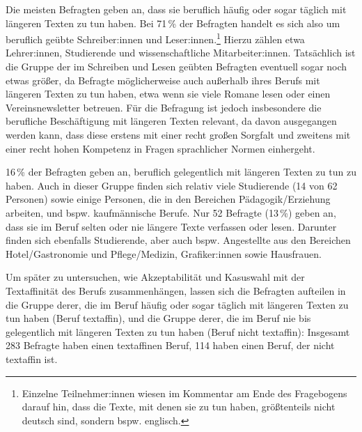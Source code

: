 Die meisten Befragten geben an, dass sie beruflich häufig oder sogar täglich mit längeren Texten zu tun haben.
Bei 71\,\% der Befragten handelt es sich also um beruflich geübte Schreiber:innen und Leser:innen.\footnote{Einzelne Teilnehmer:innen wiesen im Kommentar am Ende des Fragebogens darauf hin, dass die Texte, mit denen sie zu tun haben, größtenteils nicht deutsch sind, sondern bspw. englisch.}
Hierzu zählen etwa Lehrer:innen, Studierende und wissenschaftliche Mitarbeiter:innen. 
Tatsächlich ist die Gruppe der im Schreiben und Lesen geübten Befragten eventuell sogar noch etwas größer, da Befragte möglicherweise auch außerhalb ihres Berufs mit längeren Texten zu tun haben, etwa wenn sie viele Romane lesen oder einen Vereinsnewsletter betreuen. 
Für die Befragung ist jedoch insbesondere die berufliche Beschäftigung mit längeren Texten relevant, da davon ausgegangen werden kann, dass diese erstens mit einer recht großen Sorgfalt und zweitens mit einer recht hohen Kompetenz in Fragen sprachlicher Normen einhergeht. 

16\,\% der Befragten geben an, beruflich gelegentlich mit längeren Texten zu tun zu haben. 
Auch in dieser Gruppe finden sich relativ viele Studierende (14 von 62 Personen) sowie einige Personen, die in den Bereichen Pädagogik/Erziehung arbeiten, und bspw. kaufmännische Berufe.
Nur 52 Befragte (13\,\%) geben an, dass sie im Beruf selten oder nie längere Texte verfassen oder lesen. 
Darunter finden sich ebenfalls Studierende, aber auch bspw. Angestellte aus den Bereichen Hotel/Gastronomie und Pflege/Medizin, Grafiker:innen sowie Hausfrauen. 

Um später zu untersuchen, wie Akzeptabilität und Kasuswahl mit der Textaffinität des Berufs zusammenhängen, lassen sich die Befragten aufteilen in die Gruppe derer, die im Beruf häufig oder sogar täglich mit längeren Texten zu tun haben (Beruf textaffin), und die Gruppe derer, die im Beruf nie bis gelegentlich mit längeren Texten zu tun haben (Beruf nicht textaffin): 
Insgesamt 283 Befragte haben einen textaffinen Beruf, 114 haben einen Beruf, der nicht textaffin ist. 
